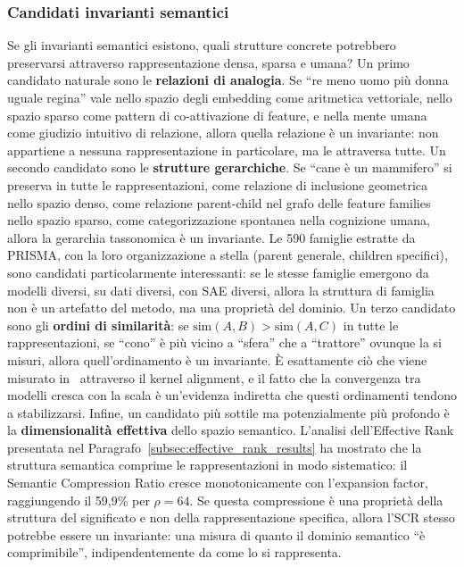 \subsubsection{Candidati invarianti semantici}
\label{subsubsec:candidati_invarianti}
Se gli invarianti semantici esistono, quali strutture concrete potrebbero preservarsi attraverso rappresentazione densa, sparsa e umana?
Un primo candidato naturale sono le \textbf{relazioni di analogia}. Se ``re meno uomo più donna uguale regina'' vale nello spazio degli embedding come aritmetica vettoriale, nello spazio sparso come pattern di co-attivazione di feature, e nella mente umana come giudizio intuitivo di relazione, allora quella relazione è un invariante: non appartiene a nessuna rappresentazione in particolare, ma le attraversa tutte.
Un secondo candidato sono le \textbf{strutture gerarchiche}. Se ``cane è un mammifero'' si preserva in tutte le rappresentazioni, come relazione di inclusione geometrica nello spazio denso, come relazione parent-child nel grafo delle feature families nello spazio sparso, come categorizzazione spontanea nella cognizione umana, allora la gerarchia tassonomica è un invariante. Le 590 famiglie estratte da PRISMA, con la loro organizzazione a stella (parent generale, children specifici), sono candidati particolarmente interessanti: se le stesse famiglie emergono da modelli diversi, su dati diversi, con SAE diversi, allora la struttura di famiglia non è un artefatto del metodo, ma una proprietà del dominio.
Un terzo candidato sono gli \textbf{ordini di similarità}: se $\text{sim}(A, B) > \text{sim}(A, C)$ in tutte le rappresentazioni, se ``cono'' è più vicino a ``sfera'' che a ``trattore'' ovunque la si misuri, allora quell'ordinamento è un invariante. È esattamente ciò che viene misurato in~\parencite{huh2024platonic} attraverso il kernel alignment, e il fatto che la convergenza tra modelli cresca con la scala è un'evidenza indiretta che questi ordinamenti tendono a stabilizzarsi.
Infine, un candidato più sottile ma potenzialmente più profondo è la \textbf{dimensionalità effettiva} dello spazio semantico. L'analisi dell'Effective Rank presentata nel Paragrafo~\ref{subsec:effective_rank_results} ha mostrato che la struttura semantica comprime le rappresentazioni in modo sistematico: il Semantic Compression Ratio cresce monotonicamente con l'expansion factor, raggiungendo il 59,9\% per $\rho = 64$. Se questa compressione è una proprietà della struttura del significato e non della rappresentazione specifica, allora l'SCR stesso potrebbe essere un invariante: una misura di quanto il dominio semantico ``è comprimibile'', indipendentemente da come lo si rappresenta.
